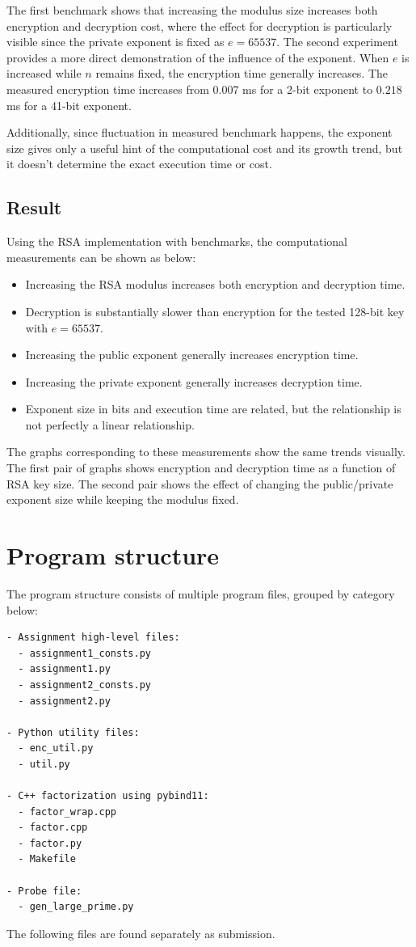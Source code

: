 \documentclass[11pt,a4paper]{article}
\begin{document}
The first benchmark shows that increasing the modulus size increases both encryption and decryption cost, where the effect for decryption is particularly visible since the private exponent is fixed as $e=65537$. The second experiment provides a more direct demonstration of the influence of the exponent. When $e$ is increased while $n$ remains fixed, the encryption time generally increases. The measured encryption time increases from $0.007$ ms for a 2-bit exponent to $0.218$ ms for a 41-bit exponent.

Additionally, since fluctuation in measured benchmark happens, the exponent size gives only a useful hint of the computational cost and its growth trend, but it doesn't determine the exact execution time or cost.

\subsection*{Result}

Using the RSA implementation with benchmarks, the computational measurements can be shown as below:

\begin{itemize}
\item Increasing the RSA modulus increases both encryption and decryption time.
\item Decryption is substantially slower than encryption for the tested 128-bit key with $e=65537$.
\item Increasing the public exponent generally increases encryption time.
\item Increasing the private exponent generally increases decryption time.
\item Exponent size in bits and execution time are related, but the relationship is not perfectly a linear relationship.
\end{itemize}

The graphs corresponding to these measurements show the same trends visually. The first pair of graphs shows encryption and decryption time as a function of RSA key size. The second pair shows the effect of changing the public/private exponent size while keeping the modulus fixed.

\section*{Program structure}

The program structure consists of multiple program files, grouped by category below:
\begin{lstlisting}
- Assignment high-level files:
  - assignment1_consts.py
  - assignment1.py
  - assignment2_consts.py
  - assignment2.py
  
- Python utility files:
  - enc_util.py
  - util.py
  
- C++ factorization using pybind11:
  - factor_wrap.cpp
  - factor.cpp
  - factor.py
  - Makefile
  
- Probe file:
  - gen_large_prime.py
\end{lstlisting}
The following files are found separately as submission.
\end{document}
